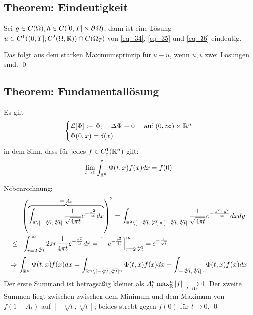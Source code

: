 \subsection{Theorem: Eindeutigkeit}
\label{thm_88}
	Sei $g \in C(\Omega), h \in C([0,T] \times \operatorname{\partial} \Omega)$, \marginnote{[88]} dann ist eine Lösung $u \in C^1((0,T];C^2(\Omega,\mathbb{R})) \cap C(\Omega_T)$ von \eqref{eq_34}, \eqref{eq_35} und \eqref{eq_36} eindeutig.

	Das folgt aus dem starken Maximumsprinzip für $u - \tilde{u}$, wenn $u,\tilde{u}$ zwei Lösungen sind. \qed
	
\subsection{Theorem: Fundamentallösung}
\label{thm_89}
	Es gilt \marginnote{[89]}
	\[ \begin{cases}
		\mathcal{L}[\Phi] := \Phi_t - \Delta \Phi = 0 & \text{ auf } (0,\infty) \times \mathbb{R}^n \\
		\Phi(0,x) = \delta(x) \end{cases} \]
	in dem Sinn, dass für jedes $f \in C_c^1(\mathbb{R}^n)$ gilt:
	\[ \lim_{t\rightarrow 0} \int_{\mathbb{R}^n} \Phi(t,x) f(x) dx = f(0) \]
		
	Nebenrechnung:
	\begin{equation}
	\begin{aligned}
		& \ \enbrace*{ \overbrace{\int_{\RR \setminus [-\sqrt[4]{t},\sqrt[4]{t}]} \frac{1}{\sqrt{4 \pi t}} e^{- \frac{x^2}{4t}} dx}^{=:A_t}}^2 = \int_{\RR^2 \setminus [-\sqrt[4]{t},\sqrt[4]{t}] \times [-\sqrt[4]{t},\sqrt[4]{t}]} \frac{1}{\sqrt{4 \pi t}} e^{- \frac{x^2+y^2}{4t}} dxdy \\ \notag
		\leq \ & \ \int_{r=2 \sqrt[4]{t}}^{\infty} 2\pi r \frac{1}{4\pi t} e^{- \frac{r^2}{4t}} dr = \left\lbrack -e^{-\frac{r^2}{4t}} \right\rbrack_{r = 2\sqrt[4]{t}}^\infty = e^{-\frac{1}{\sqrt{t}}}
	\end{aligned}
	\end{equation}
	\begin{equation}
		\Rightarrow \int_{\mathbb{R}^n} \Phi(t,x) f(x) dx = \int_{\mathbb{R}^n \setminus [-\sqrt[4]{t},\sqrt[4]{t}]^n} \Phi(t,x) f(x) dx + \int_{[-\sqrt[4]{t},\sqrt[4]{t}]^n} \Phi(t,x) f(x) dx \notag
	\end{equation}
	Der erste Summand ist betragsäßig kleiner als $A_t^n \max_\RR^n |f| \xlongrightarrow[t \rightarrow 0]{} 0$. Der zweite Summen liegt zwischen zwischen dem Minimum und dem Maximum von $f(1-A_t)$ auf $[-\sqrt[4]{t},\sqrt[4]{t}]$; beides strebt gegen $f(0)$ für $t \rightarrow 0$. \qed

